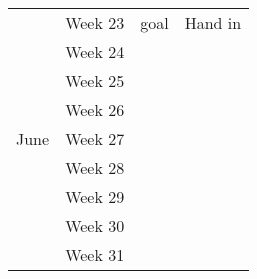 \documentclass[a4paper,10pt,titlepage]{report}
\begin{document}
\begin{tabular}{clll}
                                & Week 23      & \multirow{-2}{*}{goal}                      & \multirow{-2}{*}{Hand in}                                                                                                  \\
                                & Week 24      & \multicolumn{1}{l}{}                        & \multicolumn{1}{l}{}                                                                                                       \\
                                & Week 25      &  \multicolumn{1}{l}{}                       & \multicolumn{1}{l}{}                                                                                                       \\
                                & Week 26      &  \multicolumn{1}{l}{}                       & \multicolumn{1}{l}{}                                                                                                       \\
\multirow{-5}{*}{June}          & Week 27      & \multicolumn{1}{l}{}                        & \multicolumn{1}{l}{}                                                                                                       \\
\multicolumn{1}{l}{}            & Week 28      & \multicolumn{1}{l}{}                        & \multicolumn{1}{l}{}                                                                                                       \\
\multicolumn{1}{l}{}            & Week 29      & \multicolumn{1}{l}{}                        & \multicolumn{1}{l}{}                                                                                                       \\
\multicolumn{1}{l}{}            & Week 30      & \multicolumn{1}{l}{}                        & \multicolumn{1}{l}{}                                                                                                       \\
\multicolumn{1}{l}{}            & Week 31      & \multicolumn{1}{l}{}                        & \multicolumn{1}{l}{}                                                                                                      
\end{tabular}




%

\pagestyle{empty}
\renewcommand*{\chapterpagestyle}{empty}
\end{document}
